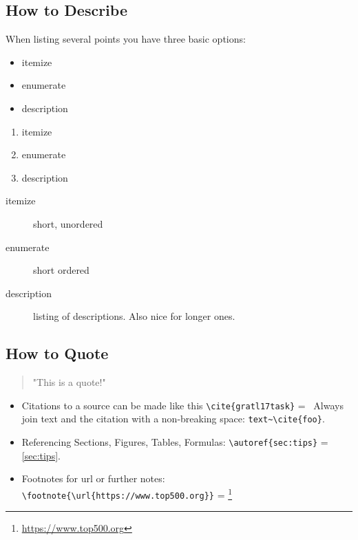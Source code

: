 \documentclass[11pt,
               a4paper,
               bibtotoc,
               idxtotoc,
               headsepline,
               footsepline,
               footexclude,
               BCOR12mm,
               DIV13,
               openany,   %
               ]
               {scrbook}
\begin{document}
\subsection{How to Describe}
\setlength{\columnsep}{30 pt}
When listing several points you have three basic options:
\begin{multicols}{3}
	\begin{itemize}
		\item itemize
		\item enumerate
		\item description
	\end{itemize}
	
	\vfill\null
	\columnbreak
	
	\begin{enumerate}
		\item itemize
		\item enumerate
		\item description
	\end{enumerate}
	
	\vfill\null
	\columnbreak
	
	\begin{description}
		\item[itemize] short, unordered
		\item[enumerate] short ordered
		\item[description] listing of descriptions. Also nice for longer ones.
	\end{description}
	
\end{multicols}


\subsection{How to Quote}

\begin{quote}
	"This is a quote!"
\end{quote}

\begin{itemize}
	\item Citations to a source can be made like this \verb|\cite{gratl17task}| =~\cite{gratl17task}
	\subitem Always join text and the citation with a non-breaking space: \verb|text~\cite{foo}|.
	\item Referencing Sections, Figures, Tables, Formulas: \verb|\autoref{sec:tips}| = \autoref{sec:tips}.
	\item Footnotes for url or further notes: \verb|\footnote{\url{https://www.top500.org}}| = \footnote{\url{https://www.top500.org}}
\end{itemize}
\end{document}
